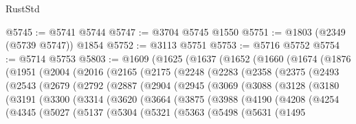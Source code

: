 \begin{lexlean}{RustStd}
\begin{coremodule}
@5745 := @5741 @5744
@5747 := @3704 @5745 @1550
@5751 := @1803 (@2349 (@5739 @5747)) @1854
@5752 := @3113 @5751
@5753 := @5716 @5752
@5754 := @5714 @5753
@5803 := @1609
    (@1625
      (@1637
        (@1652
          (@1660
            (@1674
              (@1876
                (@1951
                  (@2004
                    (@2016
                      (@2165
                        (@2175
                          (@2248
                            (@2283
                              (@2358
                                (@2375
                                  (@2493
                                    (@2543
                                      (@2679
                                        (@2792
                                          (@2887
                                            (@2904
                                              (@2945
                                                (@3069
                                                  (@3088
                                                    (@3128
                                                      (@3180
                                                        (@3191
                                                          (@3300
                                                            (@3314
                                                              (@3620
                                                                (@3664
                                                                  (@3875
                                                                    (@3988
                                                                      (@4190
                                                                        (@4208
                                                                          (@4254
                                                                            (@4345
                                                                              (@5027
                                                                                (@5137
                                                                                  (@5304
                                                                                    (@5321
                                                                                      (@5363
                                                                                        (@5498
                                                                                          (@5631
                                                                                            (@1495

\end{coremodule}
\end{lexlean}
